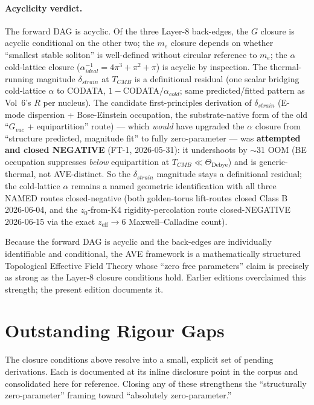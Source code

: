 \paragraph{Acyclicity verdict.}
The forward DAG is acyclic. Of the three Layer-8 back-edges, the $G$ closure is acyclic conditional on the other two; the $m_e$ closure depends on whether ``smallest stable soliton'' is well-defined without circular reference to $m_e$; the $\alpha$ cold-lattice closure ($\alpha^{-1}_{ideal} = 4\pi^3+\pi^2+\pi$) is acyclic by inspection. The thermal-running magnitude $\delta_{strain}$ at $T_{CMB}$ is a definitional residual (one scalar bridging cold-lattice $\alpha$ to CODATA, $1-$CODATA$/\alpha_{cold}$; same predicted/fitted pattern as Vol~6's $R$ per nucleus). The candidate first-principles derivation of $\delta_{strain}$ (E-mode dispersion + Bose-Einstein occupation, the substrate-native form of the old ``$G_{vac}$ + equipartition'' route) --- which \emph{would} have upgraded the $\alpha$ closure from ``structure predicted, magnitude fit'' to fully zero-parameter --- was \textbf{attempted and closed NEGATIVE} (FT-1, 2026-05-31): it undershoots by $\sim$31 OOM (BE occupation suppresses \emph{below} equipartition at $T_{CMB} \ll \Theta_{\text{Debye}}$) and is generic-thermal, not AVE-distinct. So the $\delta_{strain}$ magnitude stays a definitional residual; the cold-lattice $\alpha$ remains a named geometric identification with all three NAMED routes closed-negative (both golden-torus lift-routes closed Class B 2026-06-04, and the $z_0$-from-K4 rigidity-percolation route closed-NEGATIVE 2026-06-15 via the exact $z_{\text{eff}} \to 6$ Maxwell--Calladine count). %

Because the forward DAG is acyclic and the back-edges are individually identifiable and conditional, the AVE framework is a mathematically structured Topological Effective Field Theory whose ``zero free parameters'' claim is precisely as strong as the Layer-8 closure conditions hold. Earlier editions overclaimed this strength; the present edition documents it.

\section*{Outstanding Rigour Gaps}

The closure conditions above resolve into a small, explicit set of pending derivations. Each is documented at its inline disclosure point in the corpus and consolidated here for reference. Closing any of these strengthens the ``structurally zero-parameter'' framing toward ``absolutely zero-parameter.''

